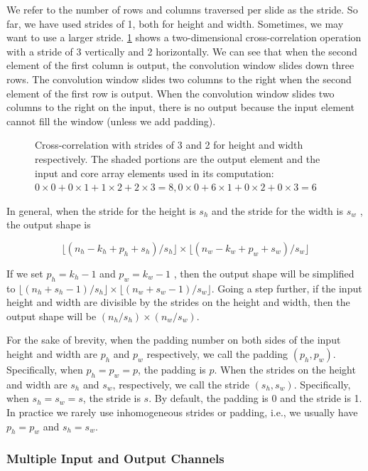 We refer to the number of rows and columns traversed per slide as the stride. So far, we have used strides of 1, both for height and width. Sometimes, we may want to use a larger stride. \cref{fig:conv_stride} shows a two-dimensional cross-correlation operation with a stride of 3 vertically and 2 horizontally. We can see that when the second element of the first column is output, the convolution window slides down three rows. The convolution window slides two columns to the right when the second element of the first row is output. When the convolution window slides two columns to the right on the input, there is no output because the input element cannot fill the window (unless we add padding).

\begin{figure}[hpt]
	\centering
	
	\caption{Cross-correlation with strides of 3 and 2 for height and width respectively. The shaded portions are the output element and the input and core array elements used in its computation: $0\times0+0\times1+1\times2+2\times3=8,  0\times0+6\times1+0\times2+0\times3=6$}
	\label{fig:conv_stride}
\end{figure}

In general, when the stride for the height is $s_h$  and the stride for the width is $s_w$ , the output shape is

$$\lfloor(n_h-k_h+p_h+s_h)/s_h\rfloor \times \lfloor(n_w-k_w+p_w+s_w)/s_w\rfloor$$
 
If we set $p_h=k_h-1$  and  $p_w=k_w-1$ , then the output shape will be simplified to $\lfloor(n_h+s_h-1)/s_h\rfloor \times \lfloor(n_w+s_w-1)/s_w\rfloor$. Going a step further, if the input height and width are divisible by the strides on the height and width, then the output shape will be $(n_h/s_h)\times(n_w/s_w)$.

For the sake of brevity, when the padding number on both sides of the input height and width are $p_h$  and $p_w$  respectively, we call the padding $(p_h,p_w)$. Specifically, when  $p_h=p_w=p$, the padding is $p$. When the strides on the height and width are $s_h$ and $s_w$, respectively, we call the stride $(s_h,s_w)$. Specifically, when $s_h=s_w=s$, the stride is $s$. By default, the padding is 0 and the stride is 1. In practice we rarely use inhomogeneous strides or padding, i.e., we usually have $p_h=p_w$ and $s_h=s_w$.

\subsubsection{Multiple Input and Output Channels}

